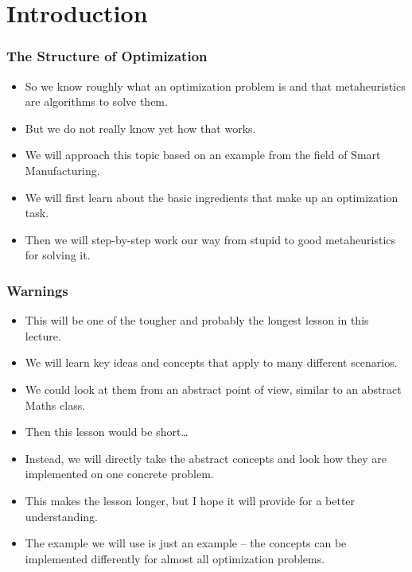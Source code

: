 \documentclass[mathserif]{beamer}%
\subtitle{2. Structure}%
\begin{document}
%
%
\startPresentation{}%
%
%
\section{Introduction}%
%
\begin{frame}%
\frametitle{The Structure of Optimization}%
\begin{itemize}%
\item So we know roughly what an optimization problem is and that metaheuristics\cite{aitoa,WGOEB,GK2003HOM,MF2004HTSIMH} are algorithms to solve them.%
\item<2-> But we do not really know yet how that works.%
\item<3-> We will approach this topic based on an example from the field of Smart Manufacturing.
\item<4-> We will first learn about the basic ingredients that make up an optimization task.%
\item<5-> Then we will step-by-step work our way from stupid to good metaheuristics for solving it.%
\end{itemize}%
\end{frame}%
%
\begin{frame}%
\frametitle{Warnings}%
\begin{itemize}%
\item This will be one of the tougher and probably the longest lesson in this lecture.%
\item<2-> We will learn key ideas and concepts that apply to many different scenarios.%
\item<3-> We could look at them from an abstract point of view, similar to an abstract Maths class.%
\item<4-> Then this lesson would be short\dots{}%
\item<6-> Instead, we will directly take the abstract concepts and look how they are implemented on one concrete problem.%
\item<7-> This makes the lesson longer, but I hope it will provide for a better understanding.%
\item<8-> The example we will use is \alert{just an example} -- the concepts can be implemented differently for almost all optimization problems.%
\end{itemize}%
\end{frame}%
%
\end{document}

